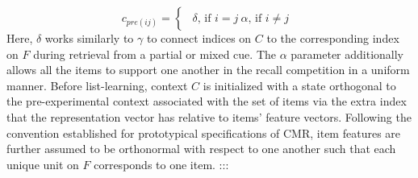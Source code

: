 {}\begin{equation} \label{eq:15} c_{pre(ij)} = \begin{cases} \begin{alignedat}{2} \delta \text{, if } i=j \ \alpha \text{, if } i \neq j \end{alignedat} \end{cases} \end{equation}\markdownRendererInterblockSeparator
{}Here, $\delta$ works similarly to $\gamma$ to connect indices on $C$ to the corresponding index on $F$ during retrieval from a partial or mixed cue. The $\alpha$ parameter additionally allows all the items to support one another in the recall competition in a uniform manner.\markdownRendererInterblockSeparator
{}Before list-learning, context $C$ is initialized with a state orthogonal to the pre-experimental context associated with the set of items via the extra index that the representation vector has relative to items' feature vectors. Following the convention established for prototypical specifications of CMR, item features are further assumed to be orthonormal with respect to one another such that each unique unit on $F$ corresponds to one item. :::\relax